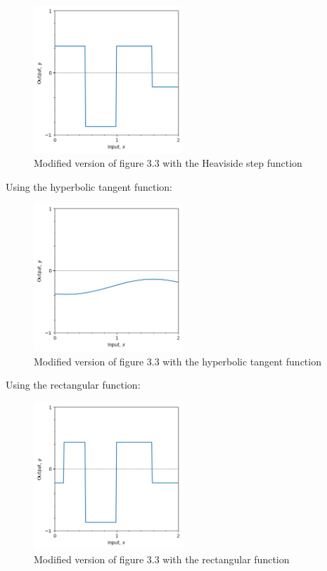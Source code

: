 \documentclass[12pt]{report}
\begin{document}
\begin{figure}[h]
    \centering
    \includegraphics[width=0.5\textwidth]{
        heaviside.png}
    \caption{Modified version of figure 3.3 with the Heaviside step function}
\end{figure}

\newpage
Using the hyperbolic tangent function:

\begin{figure}[h]
    \centering
    \includegraphics[width=0.5\textwidth]{tanh.png}
    \caption{Modified version of figure 3.3 with the hyperbolic tangent function}
\end{figure}

Using the rectangular function:

\begin{figure}[h]
    \centering
    \includegraphics[width=0.5\textwidth]{rect.png}
    \caption{Modified version of figure 3.3 with the rectangular function}
\end{figure}
\end{document}
